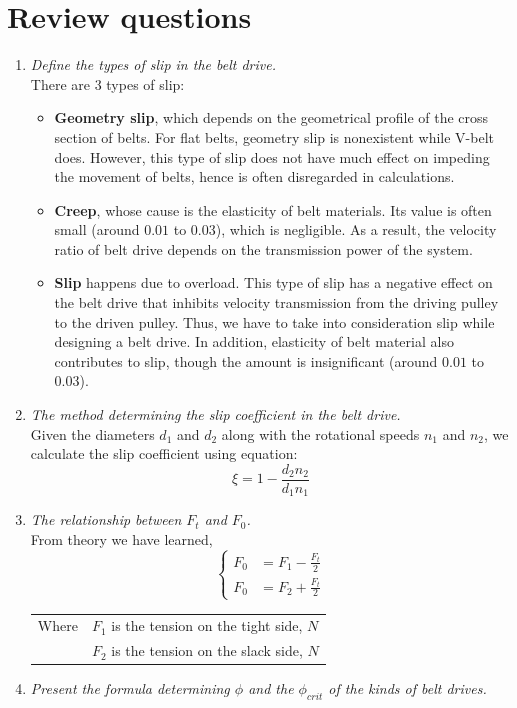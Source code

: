 \section{Review questions}
\begin{enumerate}
	\item \emph{Define the types of slip in the belt drive.}\\
	There are 3 types of slip:
	\begin{itemize}
		\item \textbf{Geometry slip}, which depends on the geometrical profile of the cross section of belts. For flat belts, geometry slip is nonexistent while V-belt does. However, this type of slip does not have much effect on impeding the movement of belts, hence is often disregarded in calculations.
		\item \textbf{Creep}, whose cause is the elasticity of belt materials. Its value is often small (around $ 0.01 $ to $ 0.03 $), which is negligible. As a result, the velocity ratio of belt drive depends on the transmission power of the system.
		\item \textbf{Slip} happens due to overload. This type of slip has a negative effect on the belt drive that inhibits velocity transmission from the driving pulley to the driven pulley. Thus, we have to take into consideration slip while designing a belt drive. In addition, elasticity of belt material also contributes to slip, though the amount is insignificant (around $ 0.01 $ to $ 0.03 $).
	\end{itemize}
	\item \emph{The method determining the slip coefficient in the belt drive.}\\
	Given the diameters $ d_1 $ and $ d_2 $ along with the rotational speeds $ n_1 $ and $ n_2 $, we calculate the slip coefficient using equation:
	\[\xi = 1 - \dfrac{d_2n_2}{d_1n_1}\]
	\item  \emph{The relationship between $ F_t $ and $ F_0 $.}\\
	From theory we have learned,
	\[\left\{\begin{array}{ll}
	F_0 & = F_1 - \frac{F_t}{2}\\
	F_0 & = F_2 + \frac{F_t}{2}
	\end{array}\right.\]
	\begin{tabular}{ll}
		Where & $ F_1 $ is the tension on the tight side, $ \unit{N} $\\
		& $ F_2 $ is the tension on the slack side, $ \unit{N} $
	\end{tabular}
	\item \emph{Present the formula determining $ \phi $ and the $ \phi_{crit} $ of the kinds of belt drives.}
	
\end{enumerate}